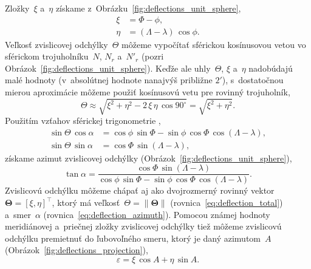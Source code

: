\documentclass[a4paper, 12pt]{book}
\begin{document}
Zložky~$\xi$ a~$\eta$ získame z~Obrázku~\ref{fig:deflections_unit_sphere},
%
\begin{equation}
\begin{split}
\xi  &= \Phi - \phi{,}\\
\eta &= (\Lambda - \lambda) \, \cos\phi{.}
\end{split}
\end{equation}
%
Veľkosť zvislicovej odchýlky~$\Theta$ môžeme vypočítať sférickou kosínusovou 
vetou vo sférickom trojuholníku~$N$, $N_r$ a~$N'_r$ (pozri 
Obrázok~\ref{fig:deflections_unit_sphere}).  Keďže ale uhly~$\Theta$, $\xi$ 
a~$\eta$ nadobúdajú malé hodnoty (v~absolútnej hodnote nanajvýš približne 
$2'$), s~dostatočnou mierou aproximácie môžeme použiť kosínusovú vetu pre 
rovinný trojuholník,
%
\begin{equation}
\label{eq:deflection_total}
\Theta \approx \sqrt{\xi^2 + \eta^2 - 2\, \xi \, \eta \, \cos 90^{\circ}} 
= \sqrt{\xi^2 + \eta^2}{.}
\end{equation}
%
Použitím vzťahov sférickej trigonometrie 
\parencite[napríklad][]{MoritzPhysicalGeodesy},
%
\begin{equation}
\label{eq:deflection_aux}
\begin{split}
\sin\Theta \, \cos\alpha &= \cos\phi \, \sin\Phi - \sin\phi \, \cos\Phi \, 
\cos(\Lambda - \lambda){,}\\
\sin\Theta \, \sin\alpha &= \cos\Phi \, \sin(\Lambda - \lambda),
\end{split}
\end{equation}
%
získame azimut zvislicovej odchýlky 
(Obrázok~\ref{fig:deflections_unit_sphere}),
%
\begin{equation}
\label{eq:deflection_azimuth}
\tan\alpha = \frac{\cos\Phi \, \sin(\Lambda - \lambda)}{\cos\phi \, \sin\Phi 
- \sin\phi \, \cos\Phi \, \cos(\Lambda - \lambda)}{.}
\end{equation}
%
Zvislicovú odchýlku môžeme chápať aj ako dvojrozmerný rovinný 
vektor~$\boldsymbol\Theta = [\xi, \eta]^\top$, ktorý má veľkosť~$\Theta = \| 
\boldsymbol\Theta \|$ (rovnica~\ref{eq:deflection_total}) a~smer~$\alpha$ 
(rovnica~\ref{eq:deflection_azimuth}).  Pomocou známej hodnoty meridiánovej 
a~priečnej zložky zvislicovej odchýlky tiež môžeme zvislicovú odchýlku 
premietnuť do ľubovoľného smeru, ktorý je daný azimutom~$A$ 
(Obrázok~\ref{fig:deflections_projection}),
%
\begin{equation}
\label{eq:deflection_vareps}
\varepsilon = \xi \, \cos A + \eta \, \sin A{.}
\end{equation}
\end{document}
